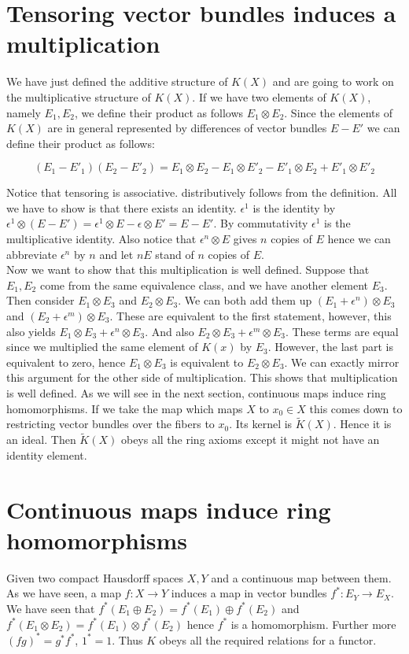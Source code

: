 \documentclass[../Thesis.tex]{subfiles}
\begin{document}
\section{Tensoring vector bundles induces a multiplication}
We have just defined the additive structure of $K(X)$ and are going to work on the multiplicative structure of $K(X)$. If we have two elements of $K(X)$, namely $E_1, E_2$, we define their product as follows $E_1 \otimes E_2$. Since the elements of $K(X)$ are in general represented by differences of vector bundles $E - E'$ we can define their product as follows:

\begin{equation} 
(E_1 - E'_1)(E_2 - E'_2) = E_1 \otimes E_2 - E_1 \otimes E'_2 - E'_1 \otimes E_2 + E'_1 \otimes E'_2
\end{equation}

Notice that tensoring is associative. distributively follows from the definition. All we have to show is that there exists an identity. $\epsilon^1$ is the identity by $\epsilon^1 \otimes ( E - E') = \epsilon^1 \otimes E - \epsilon \otimes E'= E - E'$. By commutativity $\epsilon^1$ is the multiplicative identity. Also notice that $\epsilon^n \otimes E$ gives $n$ copies of $E$ hence we can abbreviate $\epsilon^n$ by $n$ and let $nE$ stand of $n$ copies of $E$.
\\Now we want to show that this multiplication is well defined. Suppose that $E_1, E_2$ come from the same equivalence class, and we have another element $E_3$. Then consider $E_1 \otimes E_3$ and $E_2 \otimes E_3$. We can both add them up $(E_1 + \epsilon^n) \otimes E_3$ and $(E_2 + \epsilon^m) \otimes E_3$. These are equivalent to the first statement, however, this also yields $E_1 \otimes E_3 + \epsilon^n \otimes E_3$. And also $E_2 \otimes E_3 + \epsilon^m \otimes E_3$. These terms are equal since we multiplied the same element of $K(x)$ by $E_3$. However, the last part is equivalent to zero, hence $E_1 \otimes E_3$ is equivalent to $E_2 \otimes E_3$. We can exactly mirror this argument for the other side of multiplication. This shows that multiplication is well defined. As we will see in the next section, continuous maps induce ring homomorphisms. If we take the map which maps $X$ to $x_0 \in X$ this comes down to restricting vector bundles over the fibers to $x_0$. Its kernel is $\tilde{K}(X)$. Hence it is an ideal. Then $\tilde{K}(X)$ obeys all the ring axioms except it might not have an identity element.
\section{Continuous maps induce ring homomorphisms}
Given two compact Hausdorff spaces $X, Y$ and a continuous map between them. As we have seen, a map $f: X \rightarrow Y$ induces a map in vector bundles $f^*: E_Y \rightarrow E_X$. We have seen that $f^* (E_1 \oplus E_2) = f^*(E_1) \oplus f^*(E_2)$ and $f^*(E_1 \otimes E_2) = f^*(E_1) \otimes f^*(E_2)$ hence $f^*$ is a homomorphism. Further more $(fg)^* = g^* f^*$, $1^* = 1$. Thus $K$ obeys all the required relations for a functor. 
\end{document}
